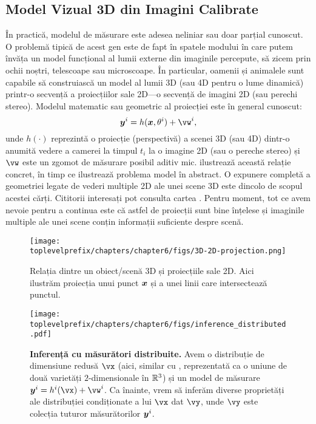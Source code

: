 \documentclass[../../book-main_ro.tex]{subfiles}
\begin{document}
\subsection{Model Vizual 3D din Imagini Calibrate}
În practică, modelul de măsurare este adesea neliniar sau doar parțial cunoscut. O problemă tipică de acest gen este de fapt în spatele modului în care putem învăța un model funcțional al lumii externe din imaginile percepute, să zicem prin ochii noștri, telescoape sau microscoape. În particular, oamenii și animalele sunt capabile să construiască un model al lumii 3D (sau 4D pentru o lume dinamică) printr-o secvență a proiecțiilor sale 2D—o secvență de imagini 2D (sau perechi stereo). Modelul matematic sau geometric al proiecției este în general cunoscut:
\begin{equation}
    \y^i = h(\x, \theta^i) +\vw^{i}, 
\end{equation}
unde $h(\cdot)$ reprezintă o proiecție (perspectivă) a scenei 3D (sau 4D) dintr-o anumită vedere a camerei la timpul $t_i$ la o imagine 2D (sau o pereche stereo) și $\vw$ este un zgomot de măsurare posibil aditiv mic.  ilustrează această relație concret, în timp ce  ilustrează problema model în abstract. O expunere completă a geometriei legate de vederi multiple 2D ale unei scene 3D este dincolo de scopul acestei cărți. Cititorii interesați pot consulta cartea \cite{MaY2003}. Pentru moment, tot ce avem nevoie pentru a continua este că astfel de proiecții sunt bine înțelese și imaginile multiple ale unei scene conțin informații suficiente despre scenă.
\begin{figure}[t]
    \centering
    \texttt{[image: \\toplevelprefix/chapters/chapter6/figs/3D-2D-projection.png]}
    \caption{Relația dintre un obiect/scenă 3D și proiecțiile sale 2D. Aici ilustrăm proiecția unui punct $\bm{x}$ și a unei linii care intersectează punctul.}
    \label{fig:projection-2D}
\end{figure}

\begin{figure}[t]
  \centering 
  \texttt{[image: \\toplevelprefix/chapters/chapter6/figs/inference\_distributed.pdf]}
  \caption{\small \textbf{Inferență cu măsurători distribuite.} Avem o distribuție de dimensiune redusă \(\vx\) (aici, similar cu , reprezentată ca o uniune de două varietăți \(2\)-dimensionale în \(\mathbb{R}^{3}\)) și un model de măsurare \(\y^{i} = h^{i}(\vx) + \vw^{i}\). Ca înainte, vrem să inferăm diverse proprietăți ale distribuției condiționate a lui \(\vx\) dat \(\vy\), unde \(\vy\) este colecția tuturor măsurătorilor \(\bm{y}^{i}\).}
  \label{fig:inference_distributed}
\end{figure}
\end{document}
